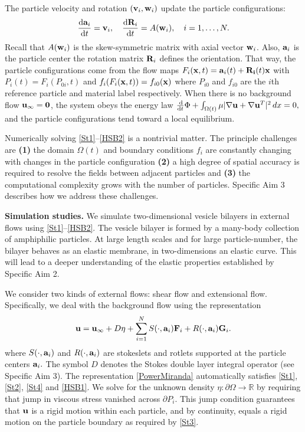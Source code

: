 The particle velocity and rotation $({\bf v}_i, {\bf w}_i)$ update the particle configurations:
\begin{alignat}{3}
\label{Hupdate1}   \frac{\dif {\bf a}_i}{\dif t} = {\bf v}_i,      \quad  \frac{\dif {\bf R}_i}{\dif t}  = A({\bf w}_i),\quad i = 1, \dots, N.
\end{alignat}
Recall that $A({\bf w}_i)$ is the skew-symmetric matrix with axial vector ${\bf w}_i$.
Also, ${\bf a}_i$ is the particle center the rotation matrix ${\bf R}_i$ defines the orientation.
That way, the particle configurations come from the flow maps $F_i({\bf x},t) = {\bf a}_i(t) + {\bf R_i}(t){\bf x}$ with
$P_i(t) = F_i(P_{0i},t)$ and $f_i(F_i({\bf x},t)) = f_{i0}({\bf x})$ where $P_{i0}$ and $f_{i0}$ are the $i$th reference particle
and material label respectively.
When there is no background flow ${\bf u}_{\infty} = {\bf 0}$, the system obeys the energy law
$\frac{\dif}{\dif t} \Phi + \int_{\Omega(t)} \mu |\nabla {\bf u} + \nabla {\bf u}^T|^2 \,dx = 0,$ 
and the particle configurations tend toward a local equilibrium.

Numerically solving \eqref{St1}--\eqref{HSB2} is a nontrivial matter.
The principle challenges are \textbf{(1)} the domain $\Omega(t)$ and boundary conditions $f_i$ are constantly changing
with changes in the particle configuration \textbf{(2)} a high degree of spatial accuracy is required to resolve the fields 
between adjacent particles and \textbf{(3)} the computational complexity grows with the number of particles. 
Specific Aim 3 describes how we address these challenges. 

\textbf{Simulation studies.}
We simulate two-dimensional vesicle bilayers in external flows using \eqref{St1}--\eqref{HSB2}.
The vesicle bilayer is formed by a many-body collection of amphiphilic particles.
At large length scales and for large particle-number, the bilayer behaves as an elastic membrane,
in two-dimensions an elastic curve. 
This will lead to a deeper understanding of the elastic properties established by Specific Aim 2.

We consider two kinds of external flows: shear flow and extensional flow. 
Specifically, we deal with the background flow using the representation 
\begin{equation}
\label{PowerMiranda}
{\bf u} = {\bf u}_{\infty} + D\eta + \sum_{i=1}^N S(\cdot, {\bf a}_i) {\bf F}_i + R(\cdot, {\bf a}_i) {\bf G}_i.
\end{equation}
where $S(\cdot, {\bf a}_i)$ and $ R(\cdot, {\bf a}_i)$ are stokeslets and rotlets supported at the particle centers ${\bf a}_i.$
The symbol $D$ denotes the Stokes double layer integral operator (see Specific Aim 3).   
The representation \eqref{PowerMiranda} automatically satisfies \eqref{St1}, \eqref{St2}, \eqref{St4} and \eqref{HSB1}.
We solve for the unknown density $\eta : \partial \Omega \to \mathbb{R}$ by requiring that jump in viscous stress
vanished across $\partial P_i$. This jump condition guarantees that ${\bf u}$ is a rigid motion within each particle,
and by continuity, equals a rigid motion on the particle boundary as required by \eqref{St3}.

